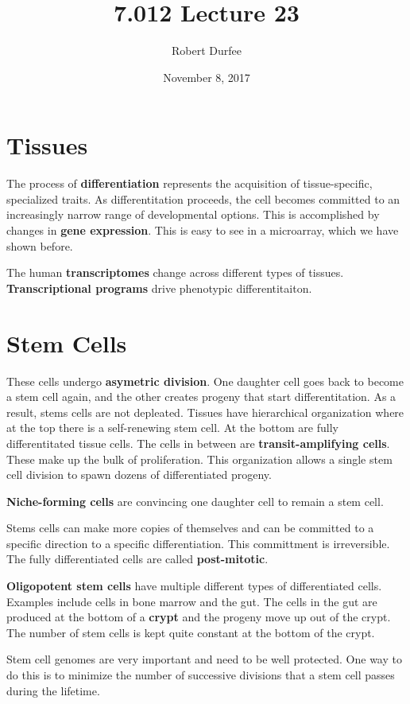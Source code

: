 \documentclass{article}
\title{ 7.012 Lecture 23 }
\author{ Robert Durfee }
\date{ November 8, 2017 }
\begin{document}
\maketitle

\section{ Tissues }

The process of \textbf{differentiation} represents the acquisition of
tissue-specific, specialized traits. As differentitation proceeds, the cell
becomes committed to an increasingly narrow range of developmental options. This
is accomplished by changes in \textbf{gene expression}. This is easy to see in a
microarray, which we have shown before.

The human \textbf{transcriptomes} change across different types of tissues.
\textbf{Transcriptional programs} drive phenotypic differentitaiton.

\section{ Stem Cells }

These cells undergo \textbf{asymetric division}. One daughter cell goes back to
become a stem cell again, and the other creates progeny that start
differentitation. As a result, stems cells are not depleated.  Tissues have
hierarchical organization where at the top there is a self-renewing stem cell.
At the bottom are fully differentitated tissue cells. The cells in between are
\textbf{transit-amplifying cells}. These make up the bulk of proliferation. This
organization allows a single stem cell division to spawn dozens of
differentiated progeny. 

\textbf{Niche-forming cells} are convincing one daughter cell to remain a stem
cell.

Stems cells can make more copies of themselves and can be committed to a
specific direction to a specific differentiation. This committment is
irreversible. The fully differentiated cells are called \textbf{post-mitotic}.

\textbf{Oligopotent stem cells} have multiple different types of differentiated
cells. Examples include cells in bone marrow and the gut. The cells in the gut
are produced at the bottom of a \textbf{crypt} and the progeny move up out of
the crypt. The number of stem cells is kept quite constant at the bottom of the
crypt.

Stem cell genomes are very important and need to be well protected. One way to
do this is to minimize the number of successive divisions that a stem cell
passes during the lifetime.
\end{document}
